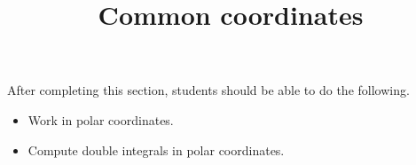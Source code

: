 \documentclass{ximera}
\title{Common coordinates}
\begin{document}
\begin{abstract}
\end{abstract}
\maketitle

\begin{sectionOutcomes}

After completing this section, students should be able to do the following.

\begin{itemize}
\item Work in polar coordinates.
\item Compute double integrals in polar coordinates.
\end{itemize}

\end{sectionOutcomes}
\end{document}
